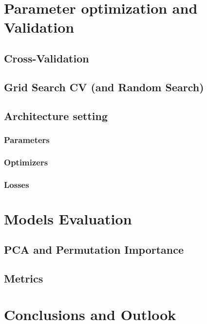 \documentclass[%
 reprint,
 amsmath,amssymb,
 aps,
]{revtex4-1}
\begin{document}


\section{\label{sec:level1}Parameter optimization and Validation}

\subsection{\label{sec:level2}Cross-Validation}

\subsection{\label{sec:level2}Grid Search CV (and Random Search)}

\subsection{\label{sec:level2}Architecture setting}

\subsubsection{Parameters}

\subsubsection{Optimizers}

\subsubsection{Losses}


\section{\label{sec:level1}Models Evaluation}

\subsection{\label{sec:level2}PCA and Permutation Importance}

\subsection{\label{sec:level2}Metrics}




\section{\label{sec:level1}Conclusions and Outlook}










\end{document}
